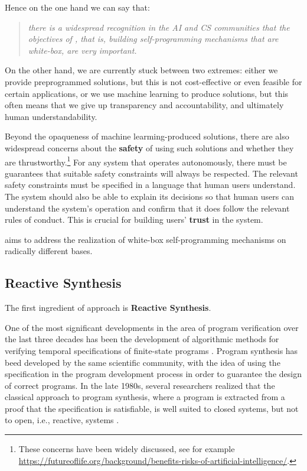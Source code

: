 Hence on the one hand we can say that:
\begin{quote}\it
there is a widespread %
 recognition in the AI and CS communities that the objectives of
 \project, that is, building %
 self-programming mechanisms that are white-box, are very important.
\end{quote}

On the other hand, we are currently stuck between 
two extremes: %
either we provide preprogrammed solutions, but this is not
cost-effective or even feasible for certain applications,
or we use machine learning to produce solutions, but this often means
that we give up transparency and accountability, and ultimately human understandability.

Beyond the opaqueness of machine learming-produced solutions, there
are also widespread concerns about the \textbf{safety} of using such solutions and
whether they are thrustworthy.\footnote{These concerns have been
  widely discussed, see for example
  \url{https://futureoflife.org/background/benefits-risks-of-artificial-intelligence/}. }
For any system that operates autonomously, there must be guarantees
that suitable safety constraints will always be respected. 
The relevant safety constraints must be specified in a language that human
users understand.
The system should also be able to explain its decisions so that human users
can understand the system's operation and confirm that it does follow
the relevant rules of conduct.
This is crucial for building users'  \textbf{trust} in the system.

\project aims %
to address the realization of white-box self-programming mechanisms on radically different bases.

\subsection{Reactive Synthesis}
The first ingredient of \project approach is \textbf{Reactive Synthesis}.

One of the most significant developments in the area of program
verification over the last three decades has been the development of
algorithmic methods for verifying temporal specifications of
finite-state programs \cite{ClarkeGP:99-ModelChecking,BaKG08}. 
Program
synthesis has beed developed by the same scientific community, with
the idea of using the specification in the program development process
in order to guarantee the design of correct programs.
 In the late 1980s,
several researchers realized that the classical approach to program
synthesis, where a program is extracted from a proof that the
specification is satisfiable, is well suited to closed systems, but
not to open, i.e.,  reactive, systems \cite{Abadi:1989ur,PnRo89,Vard96}.
 
